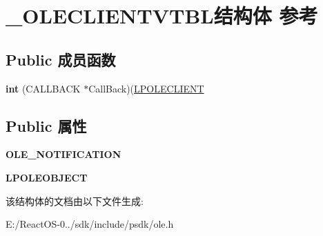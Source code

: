 \hypertarget{struct___o_l_e_c_l_i_e_n_t_v_t_b_l}{}\section{\+\_\+\+O\+L\+E\+C\+L\+I\+E\+N\+T\+V\+T\+B\+L结构体 参考}
\label{struct___o_l_e_c_l_i_e_n_t_v_t_b_l}
\subsection*{Public 成员函数}
\begin{DoxyCompactItemize}
\item 
\mbox{\label{struct___o_l_e_c_l_i_e_n_t_v_t_b_l_adef64efdfe5e32b99fb2882faf9fd806}} 
{\bfseries int} (C\+A\+L\+L\+B\+A\+CK $\ast$Call\+Back)(\hyperlink{struct___o_l_e_c_l_i_e_n_t}{L\+P\+O\+L\+E\+C\+L\+I\+E\+NT}
\end{DoxyCompactItemize}
\subsection*{Public 属性}
\begin{DoxyCompactItemize}
\item 
\mbox{\label{struct___o_l_e_c_l_i_e_n_t_v_t_b_l_af535e31bb4fe96cca587adbd5eb6d028}} 
{\bfseries O\+L\+E\+\_\+\+N\+O\+T\+I\+F\+I\+C\+A\+T\+I\+ON}
\item 
\mbox{\label{struct___o_l_e_c_l_i_e_n_t_v_t_b_l_af157c89fc5dd09f50dfff3401416a0d9}} 
{\bfseries L\+P\+O\+L\+E\+O\+B\+J\+E\+CT}
\end{DoxyCompactItemize}


该结构体的文档由以下文件生成\+:\begin{DoxyCompactItemize}
\item 
E\+:/\+React\+O\+S-\/0../sdk/include/psdk/ole.\+h\end{DoxyCompactItemize}
